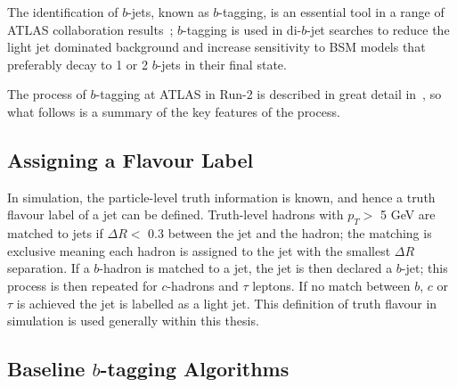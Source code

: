 The identification of $b$-jets, known as $b$-tagging, is an essential tool in a range of ATLAS collaboration results~\cite{obj-ttbar,obj-Hbb};
$b$-tagging is used in di-$b$-jet searches to reduce the light jet dominated background and increase 
sensitivity to BSM models that preferably decay to 1 or 2 $b$-jets in their final state.

The process of $b$-tagging at ATLAS in Run-2 is described in great
detail in~\cite{obj-bjets_algo_2015,obj-bjets_algo_2016},
so what follows is a summary of the key features of the process.

\subsection{Assigning a Flavour Label}
\label{sec:obj-bjets_label}

In simulation, the particle-level truth information is known, and hence a truth flavour label of a jet can be defined.
Truth-level hadrons with $p_{T} >$ 5 GeV are matched to jets if $\Delta R <$ 0.3 between the jet and the hadron;
the matching is exclusive meaning each hadron is assigned to the jet with the smallest $\Delta R$ separation.
If a $b$-hadron is matched to a jet, the jet is then declared a $b$-jet;
this process is then repeated for $c$-hadrons and $\tau$ leptons.
If no match between $b$, $c$ or $\tau$ is achieved the jet is labelled as a light jet.
This definition of truth flavour in simulation is used generally within this thesis.

   
\subsection{Baseline $b$-tagging Algorithms}

